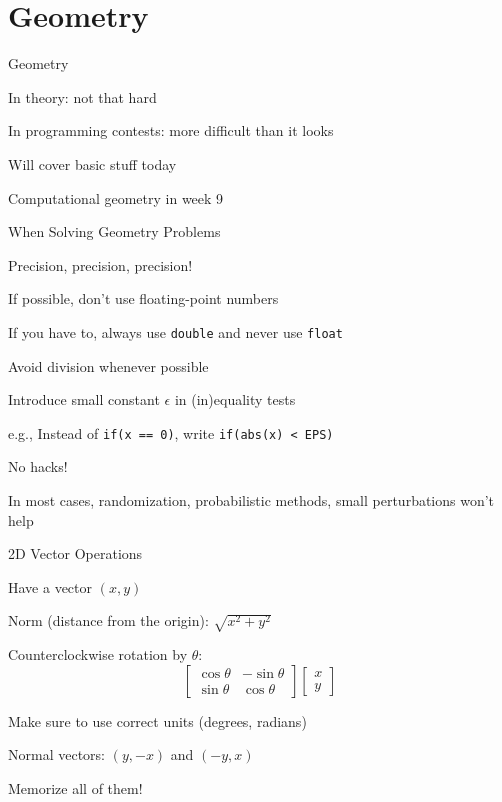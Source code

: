 \documentclass[13pt,onlymath]{beamer}
\begin{document}
\section{Geometry}

\begin{frame}{Geometry}
\BIT
\item In theory: not that hard
\item In programming contests: more difficult than it looks
\item Will cover basic stuff today
\BIT
\item Computational geometry in week 9
\EIT
\EIT
\end{frame}

\begin{frame}[fragile]{When Solving Geometry Problems}
\BIT
\item Precision, precision, precision!
\BIT
\item If possible, don't use floating-point numbers
\item If you have to, always use \verb,double, and never use \verb,float,
\item Avoid division whenever possible
\item Introduce small constant $\epsilon$ in (in)equality tests
\BIT
\item e.g., Instead of \verb,if(x == 0),, write \verb,if(abs(x) < EPS),
\EIT
\EIT
\item No hacks!
\BIT
\item In most cases, randomization, probabilistic methods, small perturbations won't help
\EIT
\EIT
\end{frame}

\begin{frame}{2D Vector Operations}
\BIT
\item Have a vector $(x, y)$
\item Norm (distance from the origin): $\sqrt{x^2+y^2}$
\item Counterclockwise rotation by $\theta$:
\[
\left[ \begin{array}{cc} \cos \theta & -\sin \theta \\ \sin \theta & \cos \theta \end{array}\right]
\left[ \begin{array}{c} x \\ y \end{array}\right]
\]
\BIT
\item Make sure to use correct units (degrees, radians)
\EIT
\item Normal vectors: $(y, -x)$ and $(-y, x)$

\item Memorize all of them!
\EIT
\end{frame}
\end{document}
